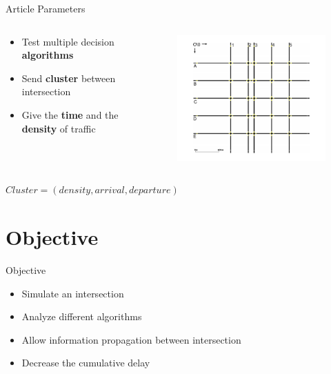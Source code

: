 \documentclass[]{beamer}
\begin{document}
\begin{frame}{Article Parameters}
 \begin{columns}
  \begin{column}[c]{5cm}
   \begin{itemize}
    \item Test multiple decision \textbf{algorithms}
    \item Send \textbf{cluster} between intersection
    \item Give the \textbf{time} and the \textbf{density} of traffic
   \end{itemize}
  \end{column}

  \begin{column}[c]{5cm}
   \begin{figure}
    \centering
    \includegraphics[width=\textwidth]{img/grid.png}
   \end{figure}
  \end{column}
 \end{columns}
 $Cluster = (density, arrival, departure)$
\end{frame}

\section{Objective}
\begin{frame}{Objective}
 \begin{itemize}
  \item Simulate an intersection
  \item Analyze different algorithms
  \item Allow information propagation between intersection
  \item Decrease the cumulative delay
 \end{itemize}
\end{frame}
\end{document}
